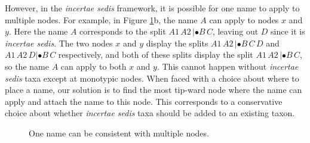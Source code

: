 \documentclass[english]{article}
\begin{document}
However, in the \emph{incertae sedis} framework, it is possible for one name to
apply to multiple nodes. For example, in Figure \ref{fig:One-name-can}b, the
name $A$ can apply to nodes $x$ and $y$. Here the name $A$ corresponds to the split
$A1\,A2\,|\bullet B\,C$, leaving out $D$ since it is \emph{incertae sedis}. The two nodes $x$
and $y$ display the splits $A1\,A2\,|\bullet B\,C\,D$ and $A1\,A2\,D|\bullet
B\,C$ respectively, and both
of these splits display the split $A1\,A2\,|\bullet B\,C$, so the name $A$ can apply to both
$x$ and $y$. This cannot happen without\emph{ incertae sedis} taxa except at
monotypic nodes. When faced with a choice about where to place a name, our
solution is to find the most tip-ward node where the name can apply and attach
the name to this node. This corresponds to a conservative choice about whether
\emph{incertae sedis} taxa should be added to an existing taxon.
\begin{figure}
\hfill{}
\hfill{}
\hfill{}
\caption{\label{fig:One-name-can}One name can be consistent with multiple nodes.}
\end{figure}
\end{document}
